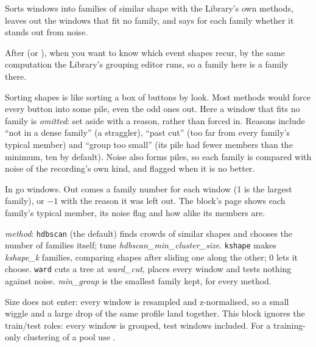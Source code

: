 Sorts windows into families of similar shape with the Library's own methods, leaves out the
windows that fit no family, and says for each family whether it stands out from noise.

After  (or ), when you want
to know which event shapes recur, by the same computation the Library's grouping editor runs, so
a family here is a family there.

\begin{plainterms}
Sorting shapes is like sorting a box of buttons by look. Most methods would force every button
into some pile, even the odd ones out. Here a window that fits no family is \emph{omitted}: set
aside with a reason, rather than forced in. Reasons include ``not in a dense family'' (a
straggler), ``past cut'' (too far from every family's typical member) and ``group too small''
(its pile had fewer members than the minimum, ten by default). Noise also forms piles, so each
family is compared with noise of the recording's own kind, and flagged when it is no better.
\end{plainterms}

In go windows. Out comes a family number for each window (1 is the largest family), or $-1$ with
the reason it was left out. The block's page shows each family's typical member, its noise flag
and how alike its members are.

\emph{method}: \texttt{hdbscan} (the default) finds crowds of similar shapes and chooses the
number of families itself; tune \emph{hdbscan\_min\_cluster\_size}. \texttt{kshape} makes
\emph{kshape\_k} families, comparing shapes after sliding one along the other; 0 lets it choose.
\texttt{ward} cuts a tree at \emph{ward\_cut}, places every window and tests nothing against
noise. \emph{min\_group} is the smallest family kept, for every method.

Size does not enter: every window is resampled and z-normalised, so a small wiggle and a large
drop of the same profile land together. This block ignores the train/test roles: every window is
grouped, test windows included. For a training-only clustering of a pool use
.
